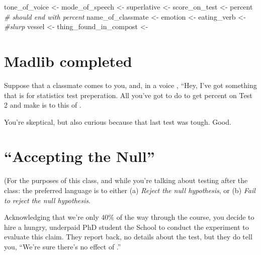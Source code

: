 \documentclass[
]{book}
\newenvironment{Shaded}{\begin{snugshade}}{\end{snugshade}}
\newcommand{\CommentTok}[1]{\textcolor[rgb]{0.56,0.35,0.01}{\textit{#1}}}
\newcommand{\NormalTok}[1]{#1}
\newcommand{\OtherTok}[1]{\textcolor[rgb]{0.56,0.35,0.01}{#1}}
\newcommand{\StringTok}[1]{\textcolor[rgb]{0.31,0.60,0.02}{#1}}
\theoremstyle{definition}
\theoremstyle{definition}
\theoremstyle{definition}
\theoremstyle{definition}
\theoremstyle{remark}
\begin{document}
\begin{Shaded}
\begin{Highlighting}[]
\NormalTok{tone\_of\_voice     }\OtherTok{\textless{}{-}} \StringTok{\textquotesingle{}\textquotesingle{}}
\NormalTok{mode\_of\_speech    }\OtherTok{\textless{}{-}} \StringTok{\textquotesingle{}\textquotesingle{}}
\NormalTok{superlative       }\OtherTok{\textless{}{-}} \StringTok{\textquotesingle{}\textquotesingle{}}
\NormalTok{score\_on\_test     }\OtherTok{\textless{}{-}} \StringTok{\textquotesingle{}percent\textquotesingle{}} \CommentTok{\# should end with percent}
\NormalTok{name\_of\_classmate }\OtherTok{\textless{}{-}} \StringTok{\textquotesingle{}\textquotesingle{}}
\NormalTok{emotion           }\OtherTok{\textless{}{-}} \StringTok{\textquotesingle{}\textquotesingle{}}
\NormalTok{eating\_verb       }\OtherTok{\textless{}{-}} \StringTok{\textquotesingle{}\textquotesingle{}} \CommentTok{\#slurp}
\NormalTok{vessel            }\OtherTok{\textless{}{-}} \StringTok{\textquotesingle{}\textquotesingle{}} 
\NormalTok{thing\_found\_in\_compost }\OtherTok{\textless{}{-}} \StringTok{\textquotesingle{}\textquotesingle{}}
\end{Highlighting}
\end{Shaded}

\section{Madlib completed}\label{madlib-completed}

Suppose that a classmate comes to you, and, in a voice , ``Hey, I've got something that is for statistics test preperation. All you've got to do to get percent on Test 2 and make is to this of .

You're skeptical, but also curious because that last test was tough. Good.

\section{``Accepting the Null''}\label{accepting-the-null}

(For the purposes of this class, and while you're talking about testing after the class: the preferred language is to either (a) \emph{Reject the null hypothesis}, or (b) \emph{Fail to reject the null hypothesis}.

Acknowledging that we're only 40\% of the way through the course, you decide to hire a hungry, underpaid PhD student the School to conduct the experiment to evaluate this claim. They report back, no details about the test, but they do tell you, ``We're sure there's no effect of .''
\end{document}
